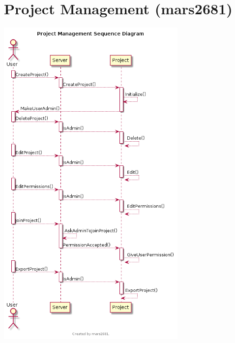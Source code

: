 \documentclass[11pt]{report}
\begin{document}
\section{Project Management (mars2681)}
    \begin{minipage}{1\textwidth}
        \begin{center}
            \includegraphics[width=0.7\textwidth]{diagrams/sequence-projectmanagement}
        \end{center}
    \end{minipage}
    
\end{document}

